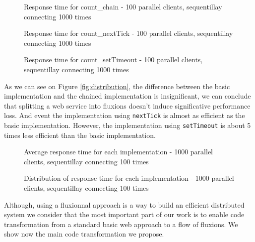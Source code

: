 \begin{figure}

\caption{Response time for count\_chain - 100 parallel clients, sequentillay connecting 1000 times}
\label{fig:timecountchain}
\end{figure}

\begin{figure}

\caption{Response time for count\_nextTick - 100 parallel clients, sequentillay connecting 1000 times}
\label{fig:timecountnextTick}
\end{figure}

\begin{figure}

\caption{Response time for count\_setTimeout - 100 parallel clients, sequentillay connecting 1000 times}
\label{fig:timecountsetTimeout}
\end{figure}

As we can see on Figure \ref{fig:distribution}, the difference between the basic implementation and the chained implementation is insignificant, we can conclude that splitting a web service into fluxions doesn't induce significative performance loss.
And event the implementation using \texttt{nextTick} is almost as efficient as the basic implementation.
However, the implementation using \texttt{setTimeout} is about 5 times less efficient than the basic implementation.

\begin{figure}

\caption{Average response time for each implementation - 1000 parallel clients, sequentillay connecting 100 times}
\label{fig:reponsetimeparallel}
\end{figure}

\begin{figure}

\caption{Distribution of response time for each implementation - 1000 parallel clients, sequentillay connecting 100 times}
\label{fig:distributionparallel}
\end{figure}




\TODO{}
Although, using a fluxionnal approach is a way to build an efficient distributed system we consider that the most important part of our work is to enable code transformation from a standard basic web approach to a flow of fluxions.
We show now the main code transformation we propose.